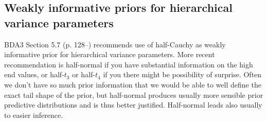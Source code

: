 \documentclass[a4paper,11pt,english]{article}
\begin{document}
\subsection*{Weakly informative priors for hierarchical variance parameters}

  BDA3 Section 5.7 (p. 128--) recommends use of half-Cauchy as weakly
  informative prior for hierarchical variance parameters. More recent
  recommendation is half-normal if you have substantial information on
  the high end values, or half-$t_3$ or half-$t_4$ if you there
  might be possibility of surprise. Often we don't have so much prior
  information that we would be able to well define the exact tail
  shape of the prior, but half-normal produces usually more sensible
  prior predictive distributions and is thus better
  justified. Half-normal leads also usually to easier inference.
\end{document}
